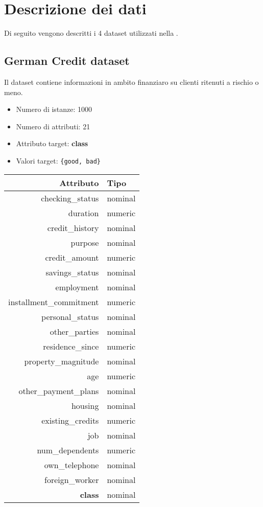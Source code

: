 \chapter{Descrizione dei dati}
\label{ch:data}

Di seguito vengono descritti i 4 dataset utilizzati nella .

\section{German Credit dataset}
Il dataset contiene informazioni in ambito finanziaro su clienti ritenuti a rischio o meno.

\begin{itemize}
	\item Numero di istanze: 1000
	\item Numero di attributi: 21
	\item Attributo target: \textbf{class}
	\item Valori target: \texttt{\{good, bad\}}
\end{itemize}

\begin{table}[!htb]
	\centering
	\begin{tabular}{|r|l|}
		\hline
		Attributo               & Tipo    \\
		\hline
		checking\_status        & nominal \\
		duration                & numeric \\
		credit\_history         & nominal \\
		purpose                 & nominal \\
		credit\_amount          & numeric \\
		savings\_status         & nominal \\
		employment              & nominal \\
		installment\_commitment & numeric \\
		personal\_status        & nominal \\
		other\_parties          & nominal \\
		residence\_since        & numeric \\
		property\_magnitude     & nominal \\
		age                     & numeric \\
		other\_payment\_plans   & nominal \\
		housing                 & nominal \\
		existing\_credits       & numeric \\
		job                     & nominal \\
		num\_dependents         & numeric \\
		own\_telephone          & nominal \\
		foreign\_worker         & nominal \\
		\textbf{class}          & nominal \\
		\hline
	\end{tabular}
\end{table}

